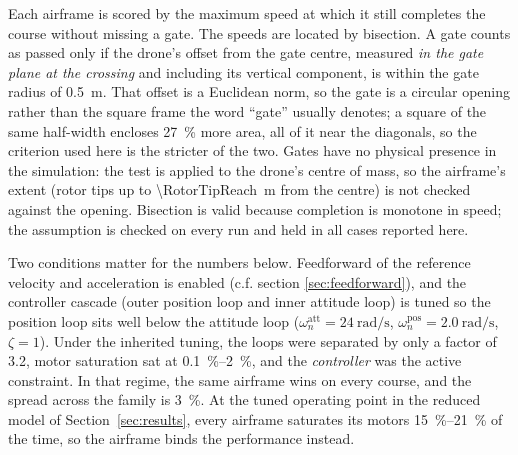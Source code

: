 \documentclass[11pt,a4paper]{article}
\begin{document}
Each airframe is scored by the maximum speed at which it still completes the course without missing a gate. The speeds are located by bisection. A gate counts as passed only if the drone's offset from the gate centre, measured \emph{in the gate plane at the crossing} and including its vertical component, is within the gate radius of \SI{0.5}{\metre}. That offset is a Euclidean norm, so the gate is a circular opening rather than the square frame the word ``gate'' usually denotes; a square of the same half-width encloses \SI{27}{\percent} more area, all of it near the diagonals, so the criterion used here is the stricter of the two.
Gates have no physical presence in the simulation: the test is applied to the drone's centre of mass, so the airframe's extent (rotor tips up to \SI{\RotorTipReach}{\metre} from the centre) is not checked against the opening.
Bisection is valid because completion is monotone in speed; the assumption is checked on every run and held in all cases reported here.

Two conditions matter for the numbers below. Feedforward of the reference velocity and acceleration is enabled (c.f. section \ref{sec:feedforward}), and the controller cascade (outer position loop and inner attitude loop) is tuned so the position loop sits well below the attitude loop ($\omega_n^{\mathrm{att}}=\SI{24}{\radian\per\second}$, $\omega_n^{\mathrm{pos}}=\SI{2.0}{\radian\per\second}$, $\zeta=1$). Under the inherited tuning, the loops were separated by only a factor of \num{3.2}, motor saturation sat at \SIrange{0.1}{2}{\percent}, and the \emph{controller} was the active constraint. In that regime, the same airframe wins on every course, and the spread across the family is \SI{3}{\percent}. %
At the tuned operating point in the reduced model of Section~\ref{sec:results}, every airframe saturates its motors \SIrange{15}{21}{\percent} of the time, so the airframe binds the performance instead.
\end{document}
